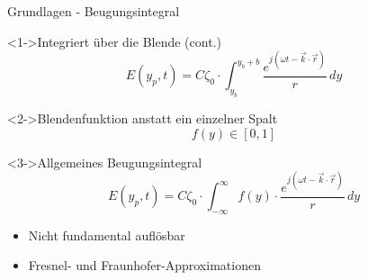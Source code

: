 \begin{frame}{Grundlagen - Beugungsintegral}
    \begin{block}<1->{Integriert über die Blende (cont.)}
        \begin{equation*}
            E(y_p, t)
            =
            C\zeta_0 \cdot \int_{y_b}^{y_b+b}\frac{e^{j(\omega t - \vec{k}\cdot\vec{r})}}{r} \,dy
            \end{equation*}
    \end{block}
    \begin{block}<2->{Blendenfunktion anstatt ein einzelner Spalt}
        \begin{equation*}
            f(y)
            \in
            [0, 1]
            \end{equation*}
    \end{block}
    \begin{exampleblock}<3->{Allgemeines Beugungsintegral}
        \begin{equation*}
            E(y_p, t)
            =
            C\zeta_0 \cdot \int_{-\infty}^{\infty}f(y)\cdot\frac{e^{j(\omega t - \vec{k}\cdot\vec{r})}}{r} \,dy
        \end{equation*}
        \begin{itemize}
            \item<4-> \textcolor{alert}{Nicht fundamental auflösbar}
            \item<5-> Fresnel- und Fraunhofer-Approximationen
        \end{itemize}
    \end{exampleblock}
\end{frame}

